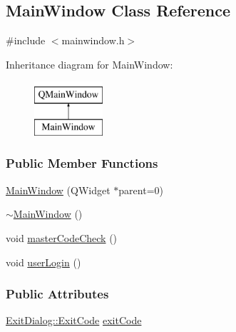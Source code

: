 \hypertarget{classMainWindow}{}\subsection{Main\+Window Class Reference}
\label{classMainWindow}


{\ttfamily \#include $<$mainwindow.\+h$>$}

Inheritance diagram for Main\+Window\+:\begin{figure}[H]
\begin{center}
\leavevmode
\includegraphics[height=2.000000cm]{classMainWindow}
\end{center}
\end{figure}
\subsubsection*{Public Member Functions}
\begin{DoxyCompactItemize}
\item 
\mbox{\hyperlink{classMainWindow_a8b244be8b7b7db1b08de2a2acb9409db}{Main\+Window}} (Q\+Widget $\ast$parent=0)
\item 
\mbox{\hyperlink{classMainWindow_ae98d00a93bc118200eeef9f9bba1dba7}{$\sim$\+Main\+Window}} ()
\item 
void \mbox{\hyperlink{classMainWindow_a960f1895aaeb4e7a6828a5eeb70b5cf1}{master\+Code\+Check}} ()
\item 
void \mbox{\hyperlink{classMainWindow_a339962b149079e9cdb8928c5528113ea}{user\+Login}} ()
\end{DoxyCompactItemize}
\subsubsection*{Public Attributes}
\begin{DoxyCompactItemize}
\item 
\mbox{\hyperlink{classExitDialog_a750dfbbef3dec32bec821122ee7b910c}{Exit\+Dialog\+::\+Exit\+Code}} \mbox{\hyperlink{classMainWindow_a40a55ca38922e5e3c0f3ee92584b72f1}{exit\+Code}}
\end{DoxyCompactItemize}
